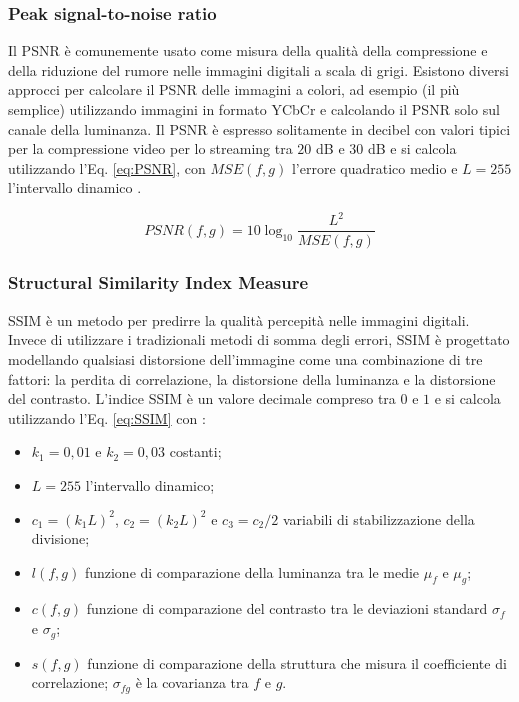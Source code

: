 \subsubsection{Peak signal-to-noise ratio}
Il PSNR è comunemente usato come misura della qualità della compressione e della riduzione del rumore nelle immagini digitali a scala di grigi. Esistono diversi approcci per calcolare il PSNR delle immagini a colori, ad esempio (il più semplice) utilizzando immagini in formato YCbCr e calcolando il PSNR solo sul canale della luminanza. Il PSNR è espresso solitamente in decibel con valori tipici per la compressione video per lo streaming tra $20$ \si{dB} e $30$ \si{dB} \parencite{ThomosN2006OtoJ} e si calcola utilizzando l'Eq. \ref{eq:PSNR}, con $MSE(f,g)$ l'errore quadratico medio e $L = 255$ l'intervallo dinamico \parencite{AnewcombinedPSNRforobjectivevideoqualityassessment}.

\begin{equation} \label{eq:PSNR}
	PSNR(f,g)=10 \log_{10}  \frac{L^2}{MSE(f,g)}	
\end{equation}



\subsubsection{Structural Similarity Index Measure}
SSIM è un metodo per predirre la qualità percepità nelle immagini digitali. Invece di utilizzare i tradizionali metodi di somma degli errori, SSIM è progettato modellando qualsiasi distorsione dell'immagine come una combinazione di tre fattori: la perdita di correlazione, la distorsione della luminanza e la distorsione del contrasto. L'indice SSIM è un valore decimale compreso tra $0$ e $1$ e si calcola utilizzando l'Eq. \ref{eq:SSIM} con \parencite{relationship_PSNR_and_SSI}:

\begin{itemize}
	\item $k_1 = 0,01$ e $k_2 = 0,03$ costanti;
	\item $L = 255$ l'intervallo dinamico;
	\item $c_1 = (k_1 L)^2$, $c_2 = (k_2 L)^2$ e $c_3 = c_2/2$ variabili di stabilizzazione della divisione;
	\item $l(f,g)$ funzione di comparazione della luminanza tra le medie $\mu_f$ e $\mu_g$;
	\item $c(f,g)$ funzione di comparazione del contrasto tra le deviazioni standard $\sigma_f$ e $\sigma_g$;
	\item $s(f,g)$ funzione di comparazione della struttura che misura il coefficiente di correlazione; $\sigma_{fg}$ è la covarianza tra $f$ e $g$.
\end{itemize}

